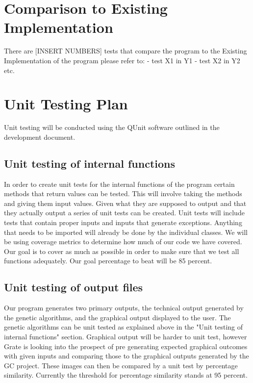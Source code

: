 \documentclass[12pt, titlepage]{article}
\begin{document}
\section{Comparison to Existing Implementation}	

There are [INSERT NUMBERS] tests that compare the program to the Existing Implementation of the program please refer to:
- test X1 in Y1
- test X2 in Y2
etc.
				
\section{Unit Testing Plan}

Unit testing will be conducted using the QUnit software outlined in the development document.
		
\subsection{Unit testing of internal functions}

In order to create unit tests for the internal functions of the program certain methods that return values
can be tested. This will involve taking the methods and giving them input values. Given what they are
supposed to output and that they actually output a series of unit tests can be created. Unit tests will include
tests that contain proper inputs and inputs that generate exceptions.  Anything that needs to be imported will already be done
by the individual classes. We will be using coverage metrics to determine how much of our code we have
covered. Our goal is to cover as much as possible in order to make sure that we test all functions adequately.
Our goal percentage to beat will be 85 percent.
		
\subsection{Unit testing of output files}		

Our program generates two primary outputs, the technical output generated by the genetic algorithms, and the graphical output displayed to the user. The genetic algorithms can be unit tested as explained above in the "Unit testing of internal functions" section. Graphical output will be harder to unit test, however Grate is looking into the prospect of pre generating expected graphical outcomes with given inputs and comparing those to the graphical outputs generated by the GC project. These images can then be compared by a unit test by percentage similarity. Currently the threshold for percentage similarity stands at 95 percent.
\end{document}
